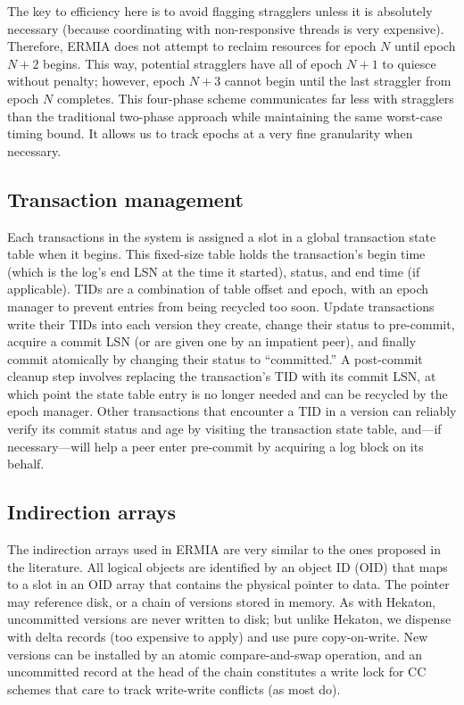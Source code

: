 The key to efficiency here is to avoid flagging stragglers unless it is absolutely necessary (because coordinating with non-responsive threads is very expensive). Therefore, ERMIA does not attempt to reclaim resources for epoch $N$ until epoch $N+2$ begins. This way, potential stragglers have all of epoch $N+1$ to quiesce without penalty; however, epoch $N+3$ cannot begin until the last straggler from epoch $N$ completes. This four-phase scheme communicates far less with stragglers than the traditional two-phase  approach while maintaining the same worst-case timing bound. It allows us to track epochs at a very fine granularity when necessary. 

\subsection{Transaction management}
Each transactions in the system is assigned a slot in a global transaction state table when it begins. This fixed-size table holds the transaction's begin time (which is the log's end LSN at the time it started), status, and end time (if applicable). TIDs are a combination of table offset and epoch, with an epoch manager to prevent entries from being recycled too soon. Update transactions write their TIDs into each version they create, change their status to pre-commit, acquire a commit LSN (or are given one by an impatient peer), and finally commit atomically by changing their status to ``committed.'' A post-commit cleanup step involves replacing the transaction's TID with its commit LSN, at which point the state table entry is no longer needed and can be recycled by the epoch manager. Other transactions that encounter a TID in a version can reliably verify its commit status and age by visiting the transaction state table, and---if necessary---will help a peer enter pre-commit by acquiring a log block on its behalf. 

\subsection{Indirection arrays}
The indirection arrays used in ERMIA are very similar to the ones proposed in the literature. All logical objects are identified by an object ID (OID) that maps to a slot in an OID array that contains the physical pointer to data. The pointer may reference disk, or a chain of versions stored in memory. As with Hekaton, uncommitted versions are never written to disk; but unlike Hekaton, we dispense with delta records (too expensive to apply) and use pure copy-on-write. New versions can be installed by an atomic compare-and-swap operation, and an uncommitted record at the head of the chain constitutes a write lock for CC schemes that care to track write-write conflicts (as most do). 


